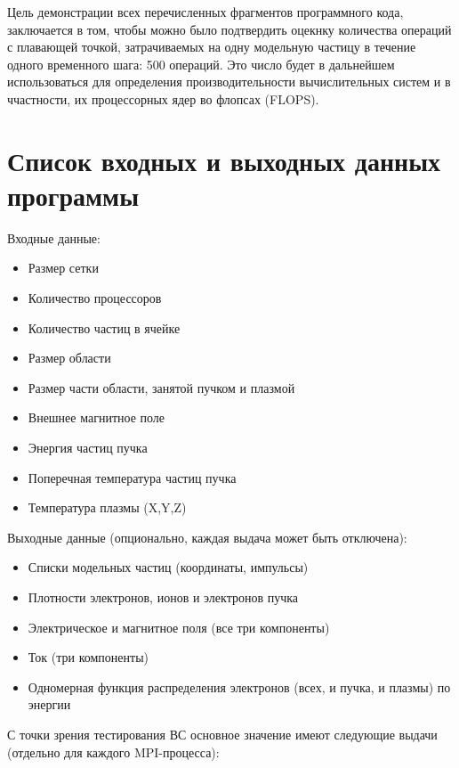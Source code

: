 Цель демонстрации всех перечисленных фрагментов программного кода, заключается в том, чтобы можно было подтвердить оцекнку количества операций с плавающей точкой, затрачиваемых на одну модельную частицу в течение одного временного шага: 500 операций. Это число будет в дальнейшем использоваться для определения производительности вычислительных систем и в ччастности, их процессорных ядер во флопсах (FLOPS).  


\section{Список входных и выходных данных программы}	

Входные данные:
\begin{itemize}
\item Размер сетки
\item Количество процессоров
\item Количество частиц в ячейке
\item Размер области
\item Размер части области, занятой пучком и плазмой
\item Внешнее магнитное поле
\item Энергия частиц пучка
\item Поперечная температура частиц пучка
\item Температура плазмы (X,Y,Z)
\end{itemize}

Выходные данные (опционально, каждая выдача может быть отключена):
\begin{itemize}
\item Списки модельных частиц (координаты, импульсы)
\item Плотности электронов, ионов и электронов пучка
\item Электрическое и магнитное поля (все три компоненты)
\item Ток (три компоненты)
\item Одномерная функция распределения электронов (всех, и пучка, и плазмы) по энергии
\end{itemize}

С точки зрения тестирования ВС основное значение имеют следующие выдачи (отдельно для каждого MPI-процесса):

